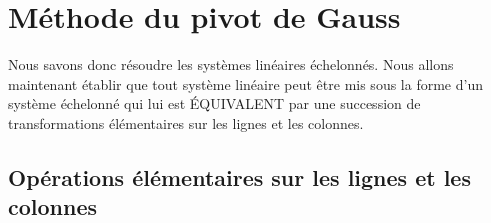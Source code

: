 \documentclass[a4paper, 11pt]{article}
\begin{document}

\section{M\'ethode du pivot de Gauss}


\noindent Nous savons donc r\'esoudre les syst\`emes lin\'eaires \'echelonn\'es. Nous allons maintenant \'etablir que tout syst\`eme lin\'eaire peut \^etre mis sous la forme d'un syst\`eme \'echelonn\'e qui lui est \'EQUIVALENT par une succession de transformations \'el\'ementaires sur les lignes et les colonnes.
\subsection{Op\'erations \'el\'ementaires sur les lignes et les colonnes}
\end{document}
